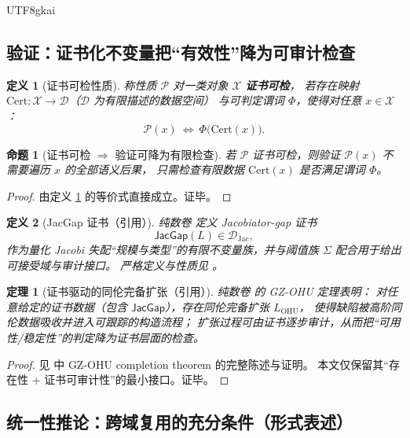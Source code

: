 \documentclass[12pt]{article}
\newtheorem{definition}{定义}[section]
\newtheorem{theorem}{定理}[section]
\newtheorem{proposition}{命题}[section]
\begin{document}
\begin{CJK*}{UTF8}{gkai}
\subsection{验证：证书化不变量把“有效性”降为可审计检查}

\begin{definition}[证书可检性质]\label{def:C-certificate-checkable}
称性质 $\mathcal{P}$ 对一类对象 $\mathcal{X}$ \textbf{证书可检}，
若存在映射 $\mathrm{Cert}:\mathcal{X}\to \mathcal{D}$（$\mathcal{D}$ 为有限描述的数据空间）
与可判定谓词 $\Phi$，使得对任意 $x\in\mathcal{X}$：
\[
  \mathcal{P}(x)\ \Longleftrightarrow\ \Phi\big(\mathrm{Cert}(x)\big).
\]
\end{definition}

\begin{proposition}[证书可检 $\Rightarrow$ 验证可降为有限检查]\label{prop:C-auditability}
若 $\mathcal{P}$ 证书可检，则验证 $\mathcal{P}(x)$ 不需要遍历 $x$ 的全部语义后果，
只需检查有限数据 $\mathrm{Cert}(x)$ 是否满足谓词 $\Phi$。
\end{proposition}

\begin{proof}
由定义 \ref{def:C-certificate-checkable} 的等价式直接成立。证毕。
\end{proof}

\begin{definition}[JacGap 证书（引用）]\label{def:C-jacgap-certificate}
纯数卷 \cite{GaoZheng2025GFramework} 定义 Jacobiator-gap 证书
\[
  \mathsf{JacGap}(L)\in \mathcal{D}_{\mathrm{Jac}},
\]
作为量化 Jacobi 失配“规模与类型”的有限不变量族，并与阈值族 $\Sigma$ 配合用于给出可接受域与审计接口。
严格定义与性质见 \cite{GaoZheng2025GFramework}。
\end{definition}

\begin{theorem}[证书驱动的同伦完备扩张（引用）]\label{thm:C-ohu-audited}
纯数卷 \cite{GaoZheng2025GFramework} 的 GZ-OHU 定理表明：
对任意给定的证书数据（包含 $\mathsf{JacGap}$），存在同伦完备扩张 $L_{\mathrm{OHU}}$，
使得缺陷被高阶同伦数据吸收并进入可跟踪的构造流程；
扩张过程可由证书逐步审计，从而把“可用性/稳定性”的判定降为证书层面的检查。
\end{theorem}

\begin{proof}
见 \cite{GaoZheng2025GFramework} 中 GZ-OHU completion theorem 的完整陈述与证明。
本文仅保留其“存在性 + 证书可审计性”的最小接口。证毕。
\end{proof}

\subsection{统一性推论：跨域复用的充分条件（形式表述）}


\end{CJK*}
\end{document}
